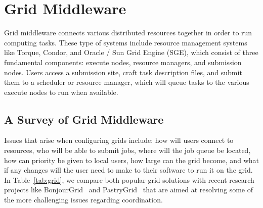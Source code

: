 \documentclass[conference]{IEEEtran}
\begin{document}
\section{Grid Middleware}
\label{middleware}

Grid middleware connects various distributed resources together in order to run
computing tasks.  These type of systems include resource management systems
like Torque, Condor, and Oracle / Sun Grid Engine (SGE), which consist of three
fundamental components: execute nodes, resource managers, and submission nodes.
Users access a submission site, craft task description files, and submit them
to a scheduler or resource manager, which will queue tasks to the various
execute nodes to run when available.

\subsection{A Survey of Grid Middleware}

Issues that arise when configuring grids include: how will users connect to
resources, who will be able to submit jobs, where will the job queue be
located, how can priority be given to local users, how large can the grid
become, and what if any changes will the user need to make to their software to
run it on the grid.  In Table~\ref{tab:grid}, we compare both popular grid
solutions with recent research projects like BonjourGrid~\cite{bonjourgrid} and
PastryGrid~\cite{pastrygrid} that are aimed at resolving some of the more
challenging issues regarding coordination.
\end{document}
